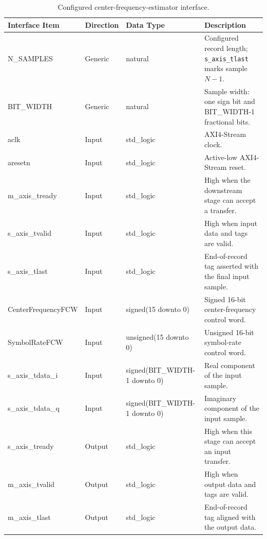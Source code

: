 \begin{table}[H]
\singlespacing
\small
\setlength{\tabcolsep}{2pt}
\renewcommand{\arraystretch}{0.95}
\begin{center}
\caption{Configured center-frequency-estimator interface.}
\begin{tabularx}{\textwidth}{|L{0.24\textwidth}|L{0.13\textwidth}|L{0.28\textwidth}|Y|}
\hline
\textbf{Interface Item} & \textbf{Direction} & \textbf{Data Type} & \textbf{Description} \\
\hline
N\_SAMPLES         & Generic & natural & Configured record length; \texttt{s\_axis\_tlast} marks sample $N-1$. \\
\hline
BIT\_WIDTH         & Generic & natural & Sample width: one sign bit and BIT\_WIDTH-1 fractional bits. \\
\hline
aclk               & Input & std\_logic & AXI4-Stream clock. \\
\hline
aresetn            & Input & std\_logic & Active-low AXI4-Stream reset. \\
\hline
m\_axis\_tready    & Input & std\_logic & High when the downstream stage can accept a transfer. \\
\hline
s\_axis\_tvalid    & Input & std\_logic & High when input data and tags are valid. \\
\hline
s\_axis\_tlast     & Input & std\_logic & End-of-record tag asserted with the final input sample. \\
\hline
CenterFrequency\newline FCW & Input & signed(15 downto 0) & Signed 16-bit center-frequency control word. \\
\hline
SymbolRateFCW      & Input & unsigned(15 downto 0) & Unsigned 16-bit symbol-rate control word. \\
\hline
s\_axis\_tdata\_i  & Input & signed(BIT\_WIDTH-1 \newline downto 0) & Real component of the input sample. \\
\hline
s\_axis\_tdata\_q  & Input & signed(BIT\_WIDTH-1 \newline downto 0) & Imaginary component of the input sample. \\
\hline
s\_axis\_tready    & Output & std\_logic & High when this stage can accept an input transfer. \\
\hline
m\_axis\_tvalid    & Output & std\_logic & High when output data and tags are valid. \\
\hline
m\_axis\_tlast     & Output & std\_logic & End-of-record tag aligned with the output data. \\

\end{tabularx}
\end{center}
\end{table}
